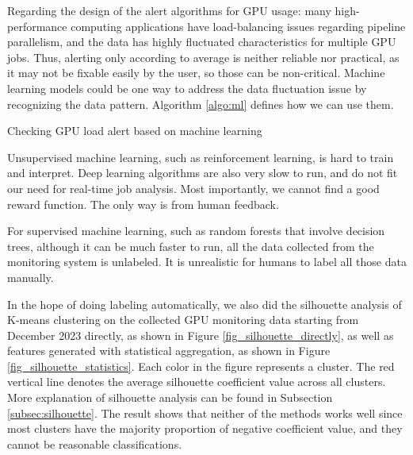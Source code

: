 Regarding the design of the alert algorithms for GPU usage: many high-performance computing applications have load-balancing issues regarding pipeline parallelism, and the data has highly fluctuated characteristics for multiple GPU jobs. Thus, alerting only according to average is neither reliable nor practical, as it may not be fixable easily by the user, so those can be non-critical. Machine learning models could be one way to address the data fluctuation issue by recognizing the data pattern. Algorithm \ref{algo:ml} defines how we can use them.

\begin{algorithm}[H]
\SetAlgoLined
{}



\caption{Checking GPU load alert based on machine learning}
\label{algo:ml}
\end{algorithm}

Unsupervised machine learning, such as reinforcement learning, is hard to train and interpret. Deep learning algorithms are also very slow to run, and do not fit our need for real-time job analysis. Most importantly, we cannot find a good reward function. The only way is from human feedback.

For supervised machine learning, such as random forests that involve decision trees, although it can be much faster to run, all the data collected from the monitoring system is unlabeled. It is unrealistic for humans to label all those data manually.

In the hope of doing labeling automatically, we also did the silhouette analysis of K-means clustering on the collected GPU monitoring data starting from December 2023 directly, as shown in Figure \ref{fig_silhouette_directly}, as well as features generated with statistical aggregation, as shown in Figure \ref{fig_silhouette_statistics}. Each color in the figure represents a cluster. The red vertical line denotes the average silhouette coefficient value across all clusters. More explanation of silhouette analysis can be found in Subsection \ref{subsec:silhouette}. The result shows that neither of the methods works well since most clusters have the majority proportion of negative coefficient value, and they cannot be reasonable classifications. 

